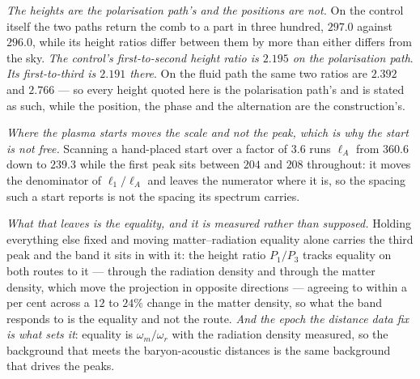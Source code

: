 \documentclass[11pt,a4paper]{article}
\theoremstyle{plain}
\theoremstyle{definition}
\theoremstyle{remark}
\begin{document}
\emph{The heights are the polarisation path's and the positions are not.} On the control itself the two paths
return the comb to a part in three hundred, $297.0$ against $296.0$, while its height ratios differ between them by
more than either differs from the sky. \emph{The control's first-to-second height ratio is $2.195$ on the polarisation
path}.
\emph{Its first-to-third is $2.191$ there}. On the fluid path the same two ratios are $2.392$ and
$2.766$ --- so every height quoted here
is the polarisation path's and is stated as such, while the position, the phase and the alternation are the
construction's.

\emph{Where the plasma starts moves the scale and not the peak, which is why the start is not free.}
Scanning a hand-placed start over a factor of $3.6$ runs $\ell_{A}$ from $360.6$ down to $239.3$ while the
first peak sits between $204$ and $208$ throughout:
it moves the denominator of $\ell_1/\ell_A$ and leaves the numerator where it
is, so the spacing such a start reports is not the spacing its spectrum carries.

\emph{What that leaves is the equality, and it is measured rather than
supposed.} Holding everything else fixed and moving matter--radiation equality alone carries the third peak
and the band it sits in with it: the height ratio $P_1/P_3$ tracks equality on both routes to it --- through
the radiation density and through the matter density, which move the projection in opposite directions ---
agreeing to within a per cent across a $12$ to $24\%$ change in the matter density, so what the band responds
to is the equality and not the route. \emph{And the epoch the distance data fix is what sets it}: equality is
$\omega_m/\omega_r$ with the radiation density measured, so the background that meets the baryon-acoustic
distances is the same background that drives the peaks.
\end{document}
